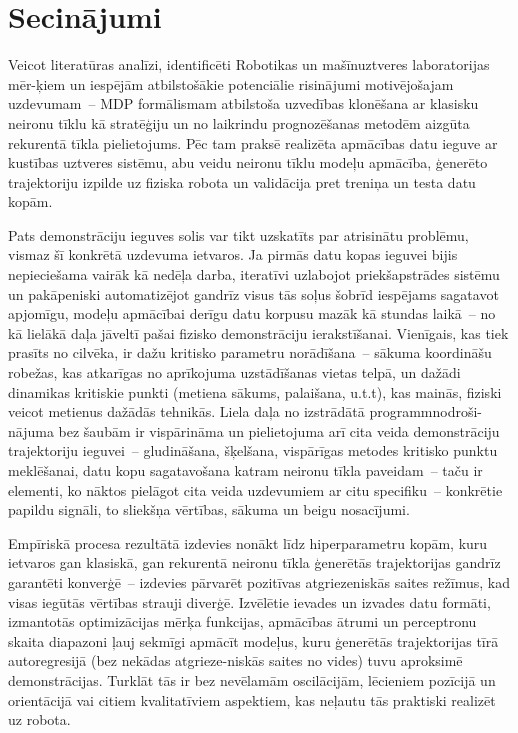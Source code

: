 \documentclass[12pt, a4paper]{article}
\numberwithin{equation}{section} %
\begin{document}
\newpage
{}
\section*{Secinājumi} %

Veicot literatūras analīzi, identificēti Robotikas un mašīnuztveres laboratorijas mēr-ķiem un iespējām atbilstošākie potenciālie risinājumi motivējošajam uzdevumam~-- MDP formālismam atbilstoša uzvedības klonēšana ar klasisku neironu tīklu kā stratēģiju un no laikrindu prognozēšanas metodēm aizgūta rekurentā tīkla pielietojums. Pēc tam praksē realizēta apmācības datu ieguve ar kustības uztveres sistēmu, abu veidu neironu tīklu modeļu apmācība, ģenerēto trajektoriju izpilde uz fiziska robota un validācija pret treniņa un testa datu kopām.

Pats demonstrāciju ieguves solis var tikt uzskatīts par atrisinātu problēmu, vismaz šī konkrētā uzdevuma ietvaros. Ja pirmās datu kopas ieguvei bijis nepieciešama vairāk kā nedēļa darba, iteratīvi uzlabojot priekšapstrādes sistēmu un pakāpeniski automatizējot gandrīz visus tās soļus šobrīd iespējams sagatavot apjomīgu, modeļu apmācībai derīgu datu korpusu mazāk kā stundas laikā~-- no kā lielākā daļa jāveltī pašai fizisko demonstrāciju ierakstīšanai. Vienīgais, kas tiek prasīts no cilvēka, ir dažu kritisko parametru norādīšana~-- sākuma koordināšu robežas, kas atkarīgas no aprīkojuma uzstādīšanas vietas telpā, un dažādi dinamikas kritiskie punkti (metiena sākums, palaišana, u.t.t), kas mainās, fiziski veicot metienus dažādās tehnikās. Liela daļa no izstrādātā programmnodroši-nājuma bez šaubām ir vispārināma un pielietojuma arī cita veida demonstrāciju trajektoriju ieguvei~-- gludināšana, šķelšana, vispārīgas metodes kritisko punktu meklēšanai, datu kopu sagatavošana katram neironu tīkla paveidam~-- taču ir elementi, ko nāktos pielāgot cita veida uzdevumiem ar citu specifiku~-- konkrētie papildu signāli, to sliekšņa vērtības, sākuma un beigu nosacījumi.

Empīriskā procesa rezultātā izdevies nonākt līdz hiperparametru kopām, kuru ietvaros gan klasiskā, gan rekurentā neironu tīkla ģenerētās trajektorijas gandrīz garantēti konverģē~-- izdevies pārvarēt pozitīvas atgriezeniskās saites režīmus, kad visas iegūtās vērtības strauji diverģē. Izvēlētie ievades un izvades datu formāti, izmantotās optimizācijas mērķa funkcijas, apmācības ātrumi un perceptronu skaita diapazoni ļauj sekmīgi apmācīt modeļus, kuru ģenerētās trajektorijas tīrā autoregresijā (bez nekādas atgrieze-niskās saites no vides) tuvu aproksimē demonstrācijas. Turklāt tās ir bez nevēlamām oscilācijām, lēcieniem pozīcijā un orientācijā vai citiem kvalitatīviem aspektiem, kas neļautu tās praktiski realizēt uz robota. 
\end{document}
